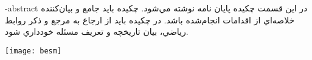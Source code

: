 

\fa-abstract{
در اين قسمت چكيده پایان نامه نوشته مي‌شو‌د‌.‌ چكيده بايد جامع و بيان‌كننده‌ خلاصه‌اي از اقدامات انجام‌شده باشد. در چكيده باید از ارجاع به مرجع و ذكر روابط رياضي، بيان تاريخچه و تعريف مسئله خودداري ‌شود. 
}




\ICStitle
\vspace*{7cm}
\thispagestyle{empty}
\begin{center}
\texttt{[image: besm]}
\end{center}